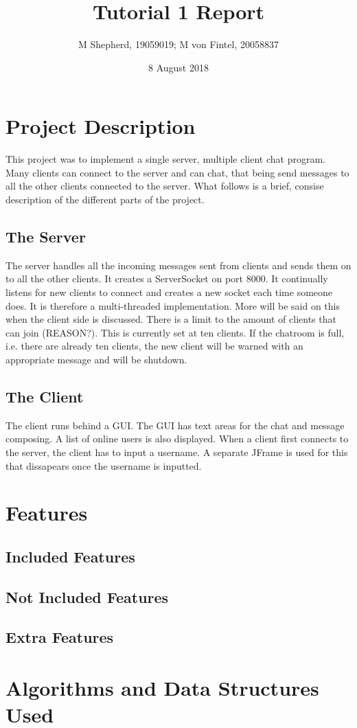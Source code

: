 \documentclass[11pt]{article}
\begin{document}
\title{Tutorial 1 Report}
\author{M Shepherd, 19059019; M von Fintel, 20058837}
\date{8 August 2018}

\maketitle
\newpage

\section{Project Description}

This project was to implement a single server, multiple client chat program.
Many clients can connect to the server and can chat, that being send messages to
all the other clients connected to the server. What follows is a brief, consise
description of the different parts of the project.

\subsection{The Server}

The server handles all the incoming messages sent from clients and sends them on
to all the other clients. It creates a ServerSocket on port 8000. It continually
listens for new clients to connect and creates a new socket each time someone
does. It is therefore a multi-threaded implementation. More will be said on this when the client side is discussed. There is a limit to the amount of clients that can join (REASON?). This is currently set at ten clients. If the chatroom is full, i.e. there are already ten clients, the new client will be warned with an appropriate message and will be shutdown.

\subsection{The Client}

The client runs behind a GUI. The GUI has text areas for the chat and message
composing. A list of online users is also displayed. When a client first
connects to the server, the client has to input a username. A separate
JFrame is used for this that dissapears once the username is inputted. 

\section{Features}

\subsection{Included Features}

\subsection{Not Included Features}

\subsection{Extra Features}

\section{Algorithms and Data Structures Used}
\end{document}
